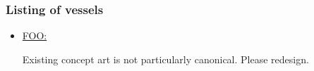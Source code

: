 \subsubsection{Listing of vessels}

\begin{itemize}
\item \href{http://vegastrike.sourceforge.net/wiki/Vessel:FOO}{FOO:} 

Existing concept art is not particularly canonical. Please redesign.

\end{itemize}

